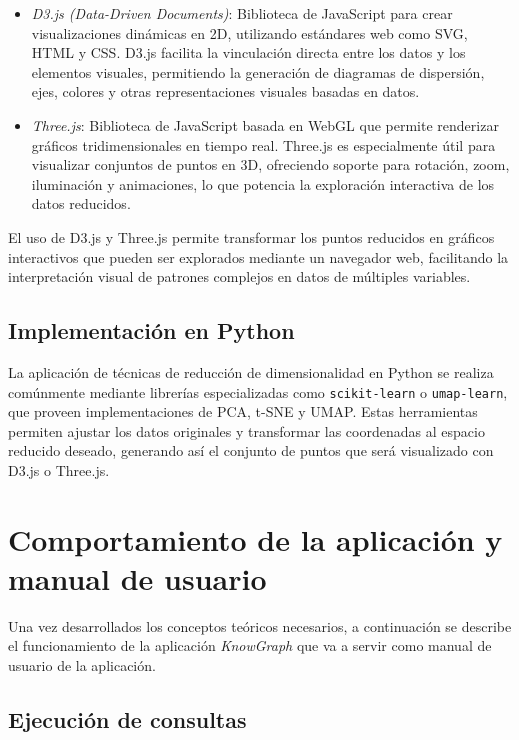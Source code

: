 \documentclass{article}
\begin{document}
\begin{itemize}
    \item \textit{D3.js (Data-Driven Documents)}\cite{d3js}: Biblioteca de JavaScript para crear visualizaciones dinámicas en 2D, utilizando estándares web como SVG, HTML y CSS. D3.js facilita la vinculación directa entre los datos y los elementos visuales, permitiendo la generación de diagramas de dispersión, ejes, colores y otras representaciones visuales basadas en datos.
    \item \textit{Three.js}\cite{threejs}: Biblioteca de JavaScript basada en WebGL que permite renderizar gráficos tridimensionales en tiempo real. Three.js es especialmente útil para visualizar conjuntos de puntos en 3D, ofreciendo soporte para rotación, zoom, iluminación y animaciones, lo que potencia la exploración interactiva de los datos reducidos.
\end{itemize}

El uso de D3.js y Three.js permite transformar los puntos reducidos en gráficos interactivos que pueden ser explorados mediante un navegador web, facilitando la interpretación visual de patrones complejos en datos de múltiples variables.

\subsection{Implementación en Python}

La aplicación de técnicas de reducción de dimensionalidad en Python se realiza comúnmente mediante librerías especializadas como \texttt{scikit-learn} o \texttt{umap-learn}\cite{umaplearn}, que proveen implementaciones de PCA, t-SNE y UMAP. Estas herramientas permiten ajustar los datos originales y transformar las coordenadas al espacio reducido deseado, generando así el conjunto de puntos que será visualizado con D3.js o Three.js.



\section{Comportamiento de la aplicación y manual de usuario}
Una vez desarrollados los conceptos teóricos necesarios, a continuación se describe el funcionamiento de la aplicación \textit{KnowGraph} que va a servir como manual de usuario de la aplicación.


\subsection{Ejecución de consultas}
\end{document}

